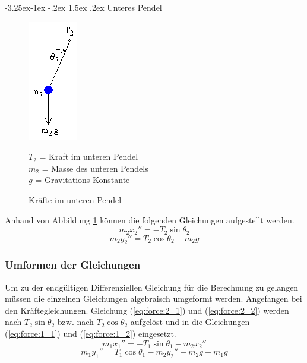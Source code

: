 \documentclass[12pt]{article}
\makeatletter
\numberwithin{equation}{subsection}
\renewcommand\paragraph{\@startsection{paragraph}{4}{\z@}%
  {-3.25ex\@plus -1ex \@minus -.2ex}%
  {1.5ex \@plus .2ex}%
  {\normalfont\normalsize\bfseries}}
\makeatother
\begin{document}
\paragraph{Unteres Pendel}
\begin{figure}[H]
	\begin{minipage}[!b]{0.5\textwidth}
		\centering
		\includegraphics[scale=1]{dbl_pendulum_m2.png}
		\caption[Kräfte im unteren Pendel]{Kräfte im unteren Pendel \citep{neumannDp04}}
		\label{fig:force_2}
	\end{minipage}
	\begin{minipage}[!t]{\textwidth}
		\vspace{0pt}\raggedright
		$T_2$ = Kraft im unteren Pendel\\
		$m_2$ = Masse des unteren Pendels\\
		$g$ = Gravitations Konstante
	\end{minipage}
\end{figure}

Anhand von Abbildung \ref{fig:force_2} können die folgenden Gleichungen aufgestellt werden.
\begin{equation} \label{eq:force:2_1}
	m_2 x_2'' = -T_2\sin\theta_2
\end{equation}
\begin{equation} \label{eq:force:2_2}
	m_2 y_2'' = T_2\cos\theta_2 - m_2 g
\end{equation}

\subsubsection{Umformen der Gleichungen}
Um zu der endgültigen Differenziellen Gleichung für die Berechnung zu gelangen müssen die einzelnen Gleichungen algebraisch umgeformt werden.
Angefangen bei den Kräftegleichungen. Gleichung (\ref{eq:force:2_1}) und (\ref{eq:force:2_2}) werden nach $T_2\sin\theta_2$ bzw. nach $T_2\cos\theta_2$ aufgelöst und in die Gleichungen (\ref{eq:force:1_1}) und (\ref{eq:force:1_2}) eingesetzt.
\begin{equation} \label{eq:dForce:1}
	m_1 x_1'' = -T_1\sin\theta_1 - m_2 x_2''
\end{equation}
\begin{equation} \label{eq:dForce:2}
	m_1 y_1'' = T_1\cos\theta_1 -m_2 y_2'' - m_2 g - m_1 g
\end{equation}
\end{document}
